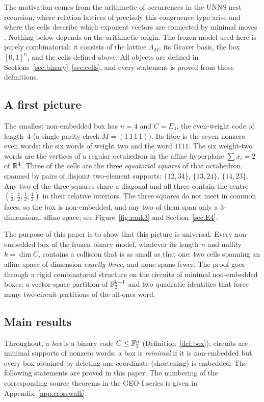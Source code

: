 The motivation comes from the arithmetic of occurrences in the UNNS nest recursion, where relation lattices of precisely this congruence type arise and where the cells describe which exponent vectors are connected by minimal moves \cite{PaperA,GEOIv001,GEOIv002,GEOIv003}. Nothing below depends on the arithmetic origin. The frozen model used here is purely combinatorial: it consists of the lattice $\Lambda_M$, its Graver basis, the box $[0,1]^n$, and the cells defined above. All objects are defined in Sections~\ref{sec:binary}--\ref{sec:cells}, and every statement is proved from those definitions.

\subsection{A first picture}

The smallest non-embedded box has $n=4$ and $C=E_4$, the even-weight code of length~$4$ (a single parity check $M=(1\,1\,1\,1)$). Its fibre is the seven nonzero even words: the six words of weight two and the word $1111$. The six weight-two words are the vertices of a regular octahedron in the affine hyperplane $\sum x_i=2$ of $\mathbb R^4$. Three of the cells are the three \emph{equatorial squares} of that octahedron, spanned by pairs of disjoint two-element supports: $\{12,34\}$, $\{13,24\}$, $\{14,23\}$. Any two of the three squares share a diagonal and all three contain the centre $(\frac12,\frac12,\frac12,\frac12)$ in their relative interiors. The three squares do not meet in common faces, so the box is non-embedded, and any two of them span only a $3$-dimensional affine space; see Figure~\ref{fig:rank3} and Section~\ref{sec:E4}.

The purpose of this paper is to show that this picture is universal. Every non-embedded box of the frozen binary model, whatever its length $n$ and nullity $k=\dim C$, contains a collision that is as small as that one: two cells spanning an affine space of dimension \emph{exactly three}, and none spans fewer. The proof goes through a rigid combinatorial structure on the circuits of minimal non-embedded boxes: a vector-space partition of $\mathbb F_2^{k-1}$ and two quadratic identities that force many two-circuit partitions of the all-ones word.

\subsection{Main results}

Throughout, a \emph{box} is a binary code $C\le\mathbb F_2^n$ (Definition~\ref{def:box}); circuits are minimal supports of nonzero words; a box is \emph{minimal} if it is non-embedded but every box obtained by deleting one coordinate (shortening) is embedded. The following statements are proved in this paper. The numbering of the corresponding source theorems in the GEO-I series is given in Appendix~\ref{app:crosswalk}.

